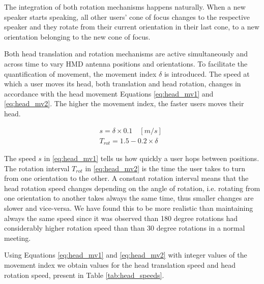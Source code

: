 \vspace{.4cm}

The integration of both rotation mechanisms happens naturally. When a new speaker starts speaking, all other users' cone of focus changes to the respective speaker and they rotate from their current orientation in their last cone, to a new orientation belonging to the new cone of focus.

Both head translation and rotation mechanisms are active simultaneously and across time to vary \ac{HMD} antenna positions and orientations. To facilitate the quantification of movement, the movement index $\delta$ is introduced. The speed at which a user moves its head, both translation and head rotation, changes in accordance with the head movement Equations \eqref{eq:head_mv1} and \eqref{eq:head_mv2}. The higher the movement index, the faster users moves their head.

\begin{gather} 
    s = \delta \times 0.1 \quad [m/s] \label{eq:head_mv1} \\
    T_{rot} = 1.5 - 0.2 \times \delta  \quad  \label{eq:head_mv2}
\end{gather}

The speed $s$ in \ref{eq:head_mv1} tells us how quickly a user hops between positions. The rotation interval $T_{rot}$ in \ref{eq:head_mv2} is the time the user takes to turn from one orientation to the other. A constant rotation interval means that the head rotation speed changes depending on the angle of rotation, i.e. rotating from one orientation to another takes always the same time, thus smaller changes are slower and vice-versa. We have found this to be more realistic than maintaining always the same speed since it was observed than 180 degree rotations had considerably higher rotation speed than than 30 degree rotations in a normal meeting.

Using Equations \eqref{eq:head_mv1} and \eqref{eq:head_mv2} with integer values of the movement index we obtain values for the head translation speed and head rotation speed, present in Table \ref{tab:head_speeds}.

